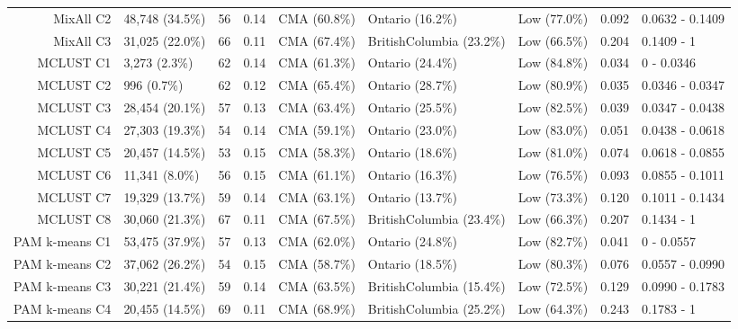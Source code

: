 \documentclass[11pt, a4paper]{article}
\begin{document}
\begin{table}[H]
{\begin{tabular}{|r|llllllll|}
  MixAll C2 & 48,748 (34.5\%) & 56 & 0.14 & CMA (60.8\%) & Ontario (16.2\%) & Low (77.0\%) & 0.092 & 0.0632 - 0.1409 \\ 
  MixAll C3 & 31,025 (22.0\%) & 66 & 0.11 & CMA (67.4\%) & BritishColumbia (23.2\%) & Low (66.5\%) & 0.204 & 0.1409 - 1 \\ 
\rowcolor{gray!25}  MCLUST C1 & 3,273 (2.3\%) & 62 & 0.14 & CMA (61.3\%) & Ontario (24.4\%) & Low (84.8\%) & 0.034 & 0 - 0.0346 \\ 
 \rowcolor{gray!25} MCLUST C2 & 996 (0.7\%) & 62 & 0.12 & CMA (65.4\%) & Ontario (28.7\%) & Low (80.9\%) & 0.035 & 0.0346 - 0.0347 \\ 
\rowcolor{gray!25}  MCLUST C3 & 28,454 (20.1\%) & 57 & 0.13 & CMA (63.4\%) & Ontario (25.5\%) & Low (82.5\%) & 0.039 & 0.0347 - 0.0438 \\ 
 \rowcolor{gray!25} MCLUST C4 & 27,303 (19.3\%) & 54 & 0.14 & CMA (59.1\%) & Ontario (23.0\%) & Low (83.0\%) & 0.051 & 0.0438 - 0.0618 \\ 
 \rowcolor{gray!25} MCLUST C5 & 20,457 (14.5\%) & 53 & 0.15 & CMA (58.3\%) & Ontario (18.6\%) & Low (81.0\%) & 0.074 & 0.0618 - 0.0855 \\ 
 \rowcolor{gray!25} MCLUST C6 & 11,341 (8.0\%) & 56 & 0.15 & CMA (61.1\%) & Ontario (16.3\%) & Low (76.5\%) & 0.093 & 0.0855 - 0.1011 \\ 
\rowcolor{gray!25}  MCLUST C7 & 19,329 (13.7\%) & 59 & 0.14 & CMA (63.1\%) & Ontario (13.7\%) & Low (73.3\%) & 0.120 & 0.1011 - 0.1434 \\ 
\rowcolor{gray!25}  MCLUST C8 & 30,060 (21.3\%) & 67 & 0.11 & CMA (67.5\%) & BritishColumbia (23.4\%) & Low (66.3\%) & 0.207 & 0.1434 - 1 \\ 
  PAM k-means C1 & 53,475 (37.9\%) & 57 & 0.13 & CMA (62.0\%) & Ontario (24.8\%) & Low (82.7\%) & 0.041 & 0 - 0.0557 \\ 
  PAM k-means C2 & 37,062 (26.2\%) & 54 & 0.15 & CMA (58.7\%) & Ontario (18.5\%) & Low (80.3\%) & 0.076 & 0.0557 - 0.0990 \\ 
  PAM k-means C3 & 30,221 (21.4\%) & 59 & 0.14 & CMA (63.5\%) & BritishColumbia (15.4\%) & Low (72.5\%) & 0.129 & 0.0990 - 0.1783 \\ 
  PAM k-means C4 & 20,455 (14.5\%) & 69 & 0.11 & CMA (68.9\%) & BritishColumbia (25.2\%) & Low (64.3\%) & 0.243 & 0.1783 - 1 \\ 
   \hline
\end{tabular}
}
\end{table}
\end{document}
